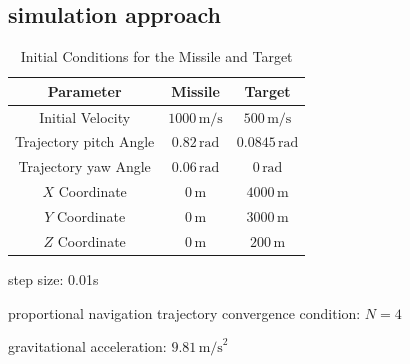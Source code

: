 \documentclass{article}
\begin{document}
\newpage

\subsection{simulation approach}
\begin{table}[h!]
  \centering
  \caption{Initial Conditions for the Missile and Target}
  \label{tab:initial_conditions}
  \begin{tabular}{|c|c|c|}
  \hline
  Parameter & Missile & Target \\
  \hline
  Initial Velocity & \(1000 \, \text{m/s}\) & \(500 \, \text{m/s}\) \\
  Trajectory pitch Angle & \(0.82 \, \text{rad}\) & \(0.0845 \, \text{rad}\) \\
  Trajectory yaw Angle & \(0.06 \, \text{rad}\) & \(0 \, \text{rad}\) \\
  \(X\) Coordinate & \(0 \, \text{m}\) & \(4000 \, \text{m}\) \\
  \(Y\) Coordinate & \(0 \, \text{m}\) & \(3000 \, \text{m}\) \\
  \(Z\) Coordinate & \(0 \, \text{m}\) & \(200 \, \text{m}\) \\
  \hline
  \end{tabular}
  \end{table}

  step size: 0.01s

  proportional navigation trajectory
  convergence condition: \( N = 4 \)

  gravitational acceleration: \( 9.81 \, \text{m/s}^2 \)
\end{document}
